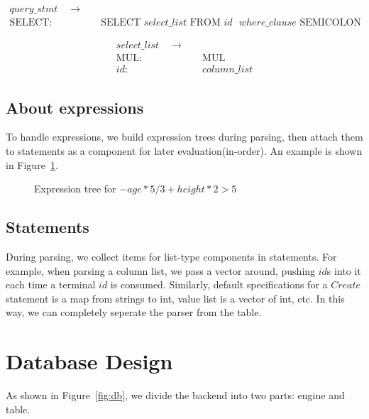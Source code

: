 \documentclass{article}
\begin{document}
\begin{align*}
query\_stmt \quad  \to & \quad\\
\text{SELECT}: & \quad \text{SELECT } select\_list \text{ FROM } id \text{ } where\_clause \text{ SEMICOLON}
\end{align*}

\begin{align*}
select\_list \quad  \to & \quad\\
\text{MUL}: & \quad \text{MUL} \\
id: & \quad column\_list
\end{align*}

\subsection{About expressions}

To handle expressions, we build expression trees during parsing, then attach them to statements as a component for later evaluation(in-order). An example is shown in Figure~\ref{fig:tree}.

\begin{figure}[H]
\centering
{}
\caption{Expression tree for $-age * 5 / 3 + height * 2 > 5$}
\label{fig:tree}
\end{figure}

\subsection{Statements}
During parsing, we collect items for list-type components in statements. For example, when parsing a column list, we pass a vector around,  pushing $id$s into it each time a terminal $id$ is consumed. Similarly, default specifications for a $Create$ statement is a map from strings to int, value list is a vector of int, etc. In this way, we can completely seperate the parser from the table.

\section{Database Design}

As shown in Figure~\ref{fig:db}, we divide the backend into two parts: engine and table.
\end{document}
